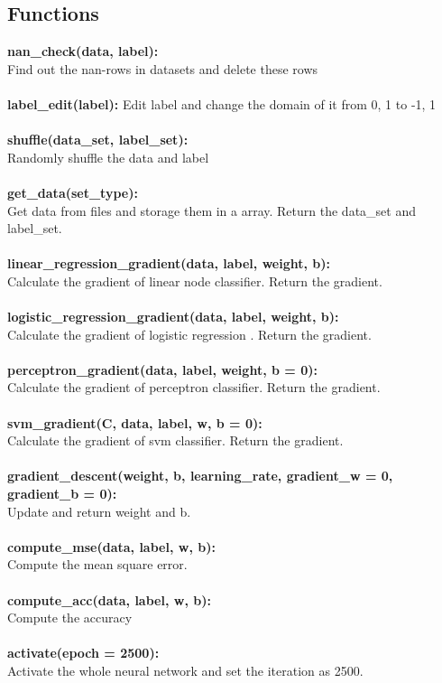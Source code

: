 \documentclass{article}
\begin{document}
\subsection{Functions}
\textbf{nan\_check(data, label):} \\Find out the nan-rows in datasets and delete these rows\\
\\\textbf{label\_edit(label):} Edit label and change the domain of it from {0, 1} to {-1, 1}\\
\\\textbf{shuffle(data\_set, label\_set):} \\Randomly shuffle the data and label\\
\\\textbf{get\_data(set\_type):} \\Get data from files and storage them in a array. Return the data\_set and label\_set.\\
\\\textbf{linear\_regression\_gradient(data, label, weight, b):} \\Calculate the gradient of linear node classifier. Return the gradient.\\
\\\textbf{logistic\_regression\_gradient(data, label, weight, b):} \\Calculate the gradient of logistic regression . Return the gradient.\\
\\\textbf{perceptron\_gradient(data, label, weight, b = 0):} \\Calculate the gradient of perceptron classifier. Return the gradient.\\
\\\textbf{svm\_gradient(C, data, label, w, b = 0):} \\Calculate the gradient of svm classifier. Return the gradient.\\
\\\textbf{gradient\_descent(weight, b, learning\_rate, gradient\_w = 0, gradient\_b = 0):} \\Update and return weight and b.\\
\\\textbf{compute\_mse(data, label, w, b):} \\Compute the mean square error.\\
\\\textbf{compute\_acc(data, label, w, b):} \\Compute the accuracy\\
\\\textbf{activate(epoch = 2500):} \\Activate the whole neural network and set the iteration as 2500.
\end{document}
